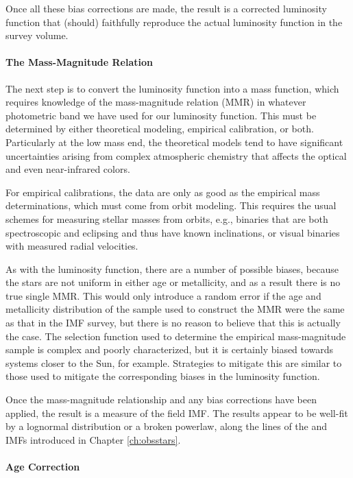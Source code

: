 Once all these bias corrections are made, the result is a corrected luminosity function that (should) faithfully reproduce the actual luminosity function in the survey volume.

\paragraph{The Mass-Magnitude Relation}

The next step is to convert the luminosity function into a mass function, which requires knowledge of the mass-magnitude relation (MMR) in whatever photometric band we have used for our luminosity function. This must be determined by either theoretical modeling, empirical calibration, or both. Particularly at the low mass end, the theoretical models tend to have significant uncertainties arising from complex atmospheric chemistry that affects the optical and even near-infrared colors. 

For empirical calibrations, the data are only as good as the empirical mass determinations, which must come from orbit modeling. This requires the usual schemes for measuring stellar masses from orbits, e.g., binaries that are both spectroscopic and eclipsing and thus have known inclinations, or visual binaries with measured radial velocities.

As with the luminosity function, there are a number of possible biases, because the stars are not uniform in either age or metallicity, and as a result there is no true single MMR. This would only introduce a random error if the age and metallicity distribution of the sample used to construct the MMR were the same as that in the IMF survey, but there is no reason to believe that this is actually the case. The selection function used to determine the empirical mass-magnitude sample is complex and poorly characterized, but it is certainly biased towards systems closer to the Sun, for example. Strategies to mitigate this are similar to those used to mitigate the corresponding biases in the luminosity function.

Once the mass-magnitude relationship and any bias corrections have been applied, the result is a measure of the field IMF. The results appear to be well-fit by a lognormal distribution or a broken powerlaw, along the lines of the \citet{chabrier05a} and \citet{kroupa02a} IMFs introduced in Chapter \ref{ch:obsstars}.

\paragraph{Age Correction}

